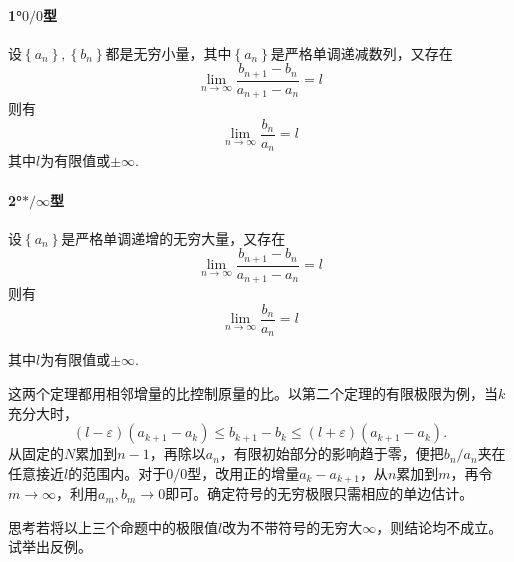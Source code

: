 \paragraph{1°\texorpdfstring{\(0/0\)}{0/0}型} \mbox{}

设\(\left\{ a_{n} \right\} , \left\{ b_{n} \right\}\)都是无穷小量，其中\(\left\{ a_{n} \right\}\)是严格单调递减数列，又存在
\begin{equation}
    \lim_{n \to \infty} \frac{b_{n + 1} - b_{n}}{a_{n + 1} - a_{n}} = l
\end{equation}
则有
\begin{equation}
    \lim_{n \to \infty} \frac{b_{n}}{a_{n}} = l
\end{equation}
其中\(l\)为有限值或\(\pm \infty\).

\paragraph{2°\texorpdfstring{\(* / \infty\)}{*/∞}型} \mbox{}

设\(\left\{ a_{n} \right\}\)是严格单调递增的无穷大量，又存在
\begin{equation}
    \lim_{n \to \infty} \frac{b_{n + 1} - b_{n}}{a_{n + 1} - a_{n}} = l
\end{equation}
则有
\begin{equation}
    \lim_{n \to \infty} \frac{b_{n}}{a_{n}} = l
\end{equation}

其中\(l\)为有限值或\(\pm \infty\).

这两个定理都用相邻增量的比控制原量的比。以第二个定理的有限极限为例，当\(k\)充分大时，
\begin{equation*}
 (l-\varepsilon)(a_{k+1}-a_k)
 \le b_{k+1}-b_k
 \le(l+\varepsilon)(a_{k+1}-a_k).
\end{equation*}
从固定的\(N\)累加到\(n-1\)，再除以\(a_n\)，有限初始部分的影响趋于零，便把\(b_n/a_n\)夹在任意接近\(l\)的范围内。对于\(0/0\)型，改用正的增量\(a_k-a_{k+1}\)，从\(n\)累加到\(m\)，再令\(m\to\infty\)，利用\(a_m,b_m\to0\)即可。确定符号的无穷极限只需相应的单边估计。

    {\kaiti{}思考\quad 若将以上三个命题中的极限值\(l\)改为不带符号的无穷大\(\infty\)，则结论均不成立。试举出反例。

\enlargethispage{2\baselineskip}}

